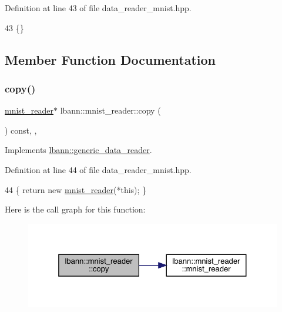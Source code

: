 Definition at line 43 of file data\+\_\+reader\+\_\+mnist.\+hpp.


\begin{DoxyCode}
43 \{\}
\end{DoxyCode}


\subsection{Member Function Documentation}
\mbox{\label{classlbann_1_1mnist__reader_a208410f6f1947b943569a3d90c8de451}} 
\subsubsection{\texorpdfstring{copy()}{copy()}}
{\footnotesize\ttfamily \hyperlink{classlbann_1_1mnist__reader}{mnist\+\_\+reader}$\ast$ lbann\+::mnist\+\_\+reader\+::copy (\begin{DoxyParamCaption}{ }\end{DoxyParamCaption}) const\hspace{0.3cm}{\ttfamily [inline]}, {\ttfamily [override]}, {\ttfamily [virtual]}}



Implements \hyperlink{classlbann_1_1generic__data__reader_a208ba1223e7aaa75e94b728501f12f86}{lbann\+::generic\+\_\+data\+\_\+reader}.



Definition at line 44 of file data\+\_\+reader\+\_\+mnist.\+hpp.


\begin{DoxyCode}
44 \{ \textcolor{keywordflow}{return} \textcolor{keyword}{new} \hyperlink{classlbann_1_1mnist__reader_a7634b11fdfc3501bd75d60c567158cbf}{mnist\_reader}(*\textcolor{keyword}{this}); \}
\end{DoxyCode}
Here is the call graph for this function\+:\nopagebreak
\begin{figure}[H]
\begin{center}
\leavevmode
\includegraphics[width=325pt]{classlbann_1_1mnist__reader_a208410f6f1947b943569a3d90c8de451_cgraph}
\end{center}
\end{figure}
\mbox{\label{classlbann_1_1mnist__reader_af257b58b61ae9f3f623f1cb5d18c4841}} 
